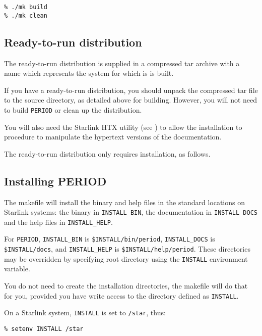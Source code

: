 \begin{myquote}
\begin{verbatim}
% ./mk build
% ./mk clean
\end{verbatim}
\end{myquote}

\subsection{Ready-to-run distribution}

The ready-to-run distribution is supplied in a compressed tar archive
with a name which represents the system for which is is built.

If you have a ready-to-run distribution, you should unpack the
compressed tar file to the source directory, as detailed above for
building.  However, you will not need to build {\tt PERIOD} or clean up
the distribution.

You will also need the Starlink HTX utility (see
) to allow the installation to procedure to
manipulate the hypertext versions of the documentation.

The ready-to-run distribution only requires installation, as follows.

\subsection{Installing PERIOD}

The makefile will install the binary and help files in the standard
locations on Starlink systems:  the binary in {\tt INSTALL\_BIN}, the
documentation in {\tt INSTALL\_DOCS} and the help files in
{\tt INSTALL\_HELP}.

For {\tt PERIOD}, {\tt INSTALL\_BIN} is {\tt \$INSTALL/bin/period},
{\tt INSTALL\_DOCS} is {\tt \$INSTALL/docs}, and
{\tt INSTALL\_HELP} is {\tt \$INSTALL/help/period}.  These
directories may be overridden by specifying root directory using the
{\tt INSTALL} environment variable.

You do not need to create the installation directories, the makefile will
do that for you, provided you have write access to the directory defined
as {\tt INSTALL}.

On a Starlink system, {\tt INSTALL} is set to {\tt /star}, thus:

\begin{myquote}
\begin{verbatim}
% setenv INSTALL /star
\end{verbatim}
\end{myquote}

